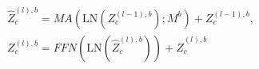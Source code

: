 \begin{equation}
\label{eq:branch-updates}
\begin{gathered}{\widehat{Z}}_{c}^{(l),b}=MA\left( \mathrm{LN}\left( {Z}_{c}^{(l-1),b}\right) ;{M}^{b}\right) +{Z}_{c}^{(l-1),b},\\{Z}_{c}^{(l),b}=FFN\left( \mathrm{LN}\left( {\widehat{Z}}_{c}^{(l),b}\right) \right) +{\widehat{Z}}_{c}^{(l),b}\end{gathered}
\end{equation}
